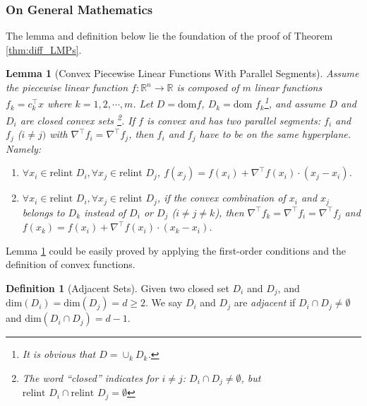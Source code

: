 \documentclass[letterpaper, 11pt]{article}
\theoremstyle{plain}
\newtheorem{lem}{Lemma}
\theoremstyle{definition}
\newtheorem{defn}{Definition}
\begin{document}
\subsubsection{On General Mathematics} \label{ssub:two_lemmas}
The lemma and definition below lie the foundation of the proof of Theorem \ref{thm:diff_LMPs}.
\begin{lem}[Convex Piecewise Linear Functions With Parallel Segments]
\label{lem:convex_piecewise_linear_function_parallel_segments}
Assume the piecewise linear function $f: \mathbb{R}^{n}\rightarrow \mathbb{R}$ is composed of $m$ linear functions $f_k = c_k^\intercal x$ where $k = 1,2,\cdots, m$. Let $D = \text{dom} f$, $D_k = \text{dom } f_k$\footnote{It is obvious that $D = \cup_k D_k$.  }, and assume $D$ and $D_i$ are closed convex sets \footnote{The word ``closed'' indicates for $i\ne j$: $D_i \cap D_j \ne \emptyset$, but $\text{relint } D_i \cap \text{relint } D_j = \emptyset$}. 
If $f$ is convex and has two parallel segments: $f_i$ and $f_j$ ($i\ne j)$ with $\nabla^\intercal f_i = \nabla^\intercal f_j$, then $f_i$ and $f_j$ have to be on the same hyperplane. Namely:
\begin{enumerate}
\item $\forall x_i \in \text{relint } D_i, \forall x_j \in \text{relint } D_j$, $f(x_j) = f(x_i) + \nabla^\intercal f(x_i)\cdot (x_j - x_i)$.
\item $\forall x_i \in \text{relint } D_i, \forall x_j \in \text{relint } D_j$, if the convex combination of $x_i$ and $x_j$ belongs to $D_k$ instead of $D_i$ or $D_j$ ($i\ne j \ne k$), then $\nabla^\intercal f_k = \nabla^\intercal f_i = \nabla^\intercal f_j$ and $f(x_k) = f(x_i) + \nabla^\intercal f(x_i)\cdot (x_k - x_i)$.
\end{enumerate}
\end{lem}
Lemma \ref{lem:convex_piecewise_linear_function_parallel_segments} could be easily proved by applying the first-order conditions and the definition of convex functions.


\begin{defn}[Adjacent Sets]
\label{defn:adjacent_sets}
Given two closed set $D_i$ and $D_j$, and $\text{dim}(D_i) = \text{dim}(D_j) = d \ge 2$. 
We say $D_i$ and $D_j$ are \emph{adjacent} if $D_i \cap D_j \ne \emptyset$ and $\text{dim}(D_i \cap D_j) = d-1$.
\end{defn}
\end{document}
